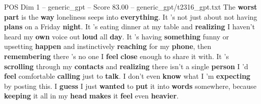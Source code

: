 \begin{textsample}{POS Dim 1 – generic\_gpt – Score 83.00 – generic\_gpt/t2316\_gpt.txt}
The \textbf{worst} \textbf{part} is the \textbf{way} loneliness seeps into \textbf{everything}.
It ’s not just about not having \textbf{plans} on a Friday \textbf{night}.
It ’s eating dinner at my table and \textbf{realizing} I haven't heard my \textbf{own} voice out \textbf{loud} all \textbf{day}.
It ’s having \textbf{something} funny or upsetting \textbf{happen} and instinctively \textbf{reaching} for my \textbf{phone}, then \textbf{remembering} there ’s no one I \textbf{feel} \textbf{close} enough to share it with.
It ’s \textbf{scrolling} through my \textbf{contacts} and \textbf{realizing} there isn't a single \textbf{person} I ’d \textbf{feel} comfortable \textbf{calling} just to \textbf{talk}.
I don't even \textbf{know} what I ’m \textbf{expecting} by posting this.
I \textbf{guess} I just \textbf{wanted} to \textbf{put} it into \textbf{words} somewhere, because \textbf{keeping} it all in my \textbf{head} \textbf{makes} it \textbf{feel} even \textbf{heavier}.

\end{textsample}
